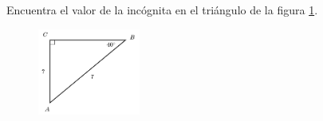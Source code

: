 Encuentra el valor de la incógnita en el triángulo de la figura \ref{fig:lados_functrig_01}.
\begin{figure}[H]
    \begin{center}
        \includegraphics[width=0.3\textwidth]{../images/lados_functrig_01.png}
    \end{center}
    \caption{}
    \label{fig:lados_functrig_01}
\end{figure}